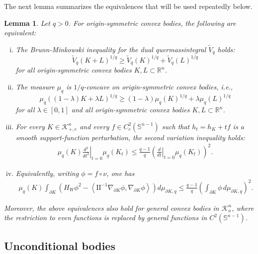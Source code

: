 \documentclass[12pt,leqno]{amsart}
\theoremstyle{plain} \newtheorem{thm}{Theorem}[section]
\theoremstyle{plain} \newtheorem{prop}[thm]{Proposition}
\theoremstyle{plain} \newtheorem{prob}[thm]{Problem}
\theoremstyle{definition} \newtheorem{defi}[thm]{Definition}
\theoremstyle{plain} \newtheorem{cor}[thm]{Corollary}
\theoremstyle{plain} \newtheorem{lem}[thm]{Lemma}
\theoremstyle{plain} \newtheorem{eg}{Example}[section]
\theoremstyle{remark} \newtheorem{rmk}[thm]{Remark}
\theoremstyle{plain} \newtheorem{conj}{Conjecture}
\numberwithin{equation}{section}
\newcommand{\bR}{\mathbb{R}}
\newcommand{\bS}{\mathbb{S}}
\newcommand{\cK}{\mathcal{K}}
\newcommand{\II}{\mathrm{II}}
\newcommand{\tV}{\widetilde V}
\begin{document}
The next lemma summarizes the equivalences that will be used repeatedly below.

\begin{lem}\label{lem-equivalent}
Let $q>0$. For origin-symmetric convex bodies, the following are equivalent:
\begin{enumerate}[(i)]
    \item The Brunn-Minkowski inequality for the dual quermassintegral $\tV_q$ holds:
    \[
        \tV_q(K+L)^{1/q}\ge \tV_q(K)^{1/q}+\tV_q(L)^{1/q}
    \]
    for all origin-symmetric convex bodies $K,L\subset\bR^n$.

    \item The measure $\mu_q$ is $1/q$-concave on origin-symmetric convex bodies, i.e.,
    \[
        \mu_q((1-\lambda)K+\lambda L)^{1/q}
        \ge (1-\lambda)\mu_q(K)^{1/q}+\lambda\mu_q(L)^{1/q}
    \]
    for all $\lambda\in[0,1]$ and all origin-symmetric convex bodies $K,L\subset\bR^n$.

    \item For every $K\in\cK_{+,e}^n$ and every $f\in C_e^2(\bS^{n-1})$ such that
    $h_t=h_K+t f$ is a smooth support-function perturbation, the second variation inequality holds:
    \begin{align}\label{eq-secondvar-equiv}
        \mu_q(K)\left.\frac{d^2}{dt^2}\right|_{t=0}\mu_q(K_t)
        \le \frac{q-1}{q}
        \left(\left.\frac{d}{dt}\right|_{t=0}\mu_q(K_t)\right)^2.
    \end{align}

    \item Equivalently, writing $\phi=f\circ\nu$, one has
    \begin{align}\label{eq-expanded-equiv}
        \mu_q(K)\int_{\partial K}\left(
        H_W\phi^2-\left\langle \II^{-1}\nabla_{\partial K}\phi,\nabla_{\partial K}\phi\right\rangle
        \right)d\mu_{\partial K,q}
        \le \frac{q-1}{q}
        \left(\int_{\partial K}\phi\,d\mu_{\partial K,q}\right)^2.
    \end{align}
\end{enumerate}
Moreover, the above equivalences also hold for general convex bodies in $\mathcal{K}_o^n$, where the restriction to even functions is replaced by general functions in $C^2(\bS^{n-1})$.
\end{lem}

\subsection{Unconditional bodies}\
\end{document}
